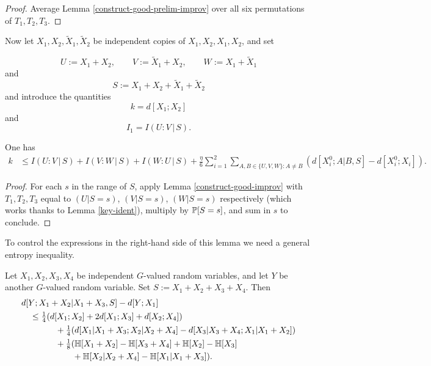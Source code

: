 \begin{proof}
\leanok
Average Lemma \ref{construct-good-prelim-improv} over all six permutations of $T_1,T_2,T_3$.
\end{proof}

Now let $X_1, X_2, \tilde X_1, \tilde X_2$ be independent copies of $X_1, X_2, X_1, X_2$, and set

\[U := X_1 + X_2, \qquad V := \tilde X_1 + X_2, \qquad W := X_1 + \tilde X_1\] and
\[  S := X_1 + X_2 + \tilde X_1 + \tilde X_2\]
and introduce the quantities
$$ k = d[X_1;X_2]$$
and
$$ I_1 = I(U : V \, | \, S).$$

\begin{lemma}\label{averaged-construct-good}\leanok
  One has
  \begin{align*}  k & \leq I(U : V \, | \, S) + I(V : W \, | \,S) + I(W : U \, | \, S) + \frac{\eta}{6}  \sum_{i=1}^2 \sum_{A,B \in \{U,V,W\}: A \neq B} (d[X^0_i;A|B,S] - d[X^0_i; X_i]).
    \end{align*}
\end{lemma}

\begin{proof}\leanok  For each $s$ in the range of $S$, apply Lemma \ref{construct-good-improv} with $T_1,T_2,T_3$ equal to $(U|S=s)$, $(V|S=s)$, $(W|S=s)$ respectively (which works thanks to Lemma \ref{key-ident}), multiply by $\mathbb{P}[S=s]$, and sum in $s$ to conclude.
\end{proof}

To control the expressions in the right-hand side of this lemma we need a general entropy inequality.

\begin{lemma}\label{gen-ineq} \leanok
Let $X_1, X_2, X_3, X_4$ be independent $G$-valued random variables, and let $Y$ be another $G$-valued random variable.  Set $S := X_1+X_2+X_3+X_4$. Then
  \begin{align*}
    &  d[Y; X_1+X_2|X_1 + X_3, S] - d[Y; X_1] \\
    &\quad \leq \tfrac{1}{4} (d[X_1;X_2] + 2d[X_1;X_3] + d[X_2;X_4])\\
    &\qquad \qquad + \tfrac{1}{4} (d[X_1|X_1+X_3;X_2|X_2+X_4] - d[X_3|X_3+X_4; X_1|X_1+X_2])\\
    &\qquad \qquad + \tfrac{1}{8} (\mathbb{H}[X_1+X_2] - \mathbb{H}[X_3+X_4] + \mathbb{H}[X_2] - \mathbb{H}[X_3]\\
    &\qquad \qquad \qquad + \mathbb{H}[X_2|X_2+X_4] - \mathbb{H}[X_1|X_1+X_3]).
\end{align*}
\end{lemma}

